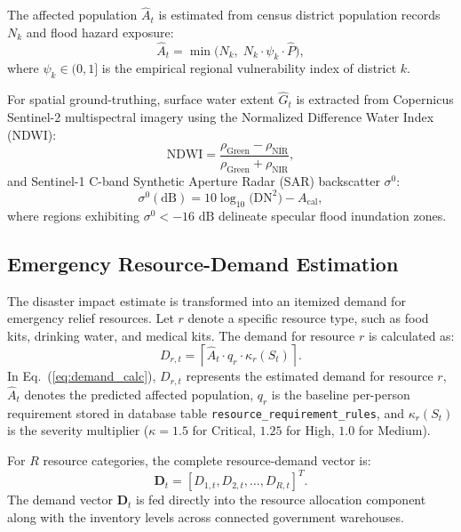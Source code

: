 \documentclass[conference]{IEEEtran}
\begin{document}
The affected population $\hat{A}_t$ is estimated from census district population records $N_k$ and flood hazard exposure:
\begin{equation}
\hat{A}_t = \min\big( N_k, \; N_k \cdot \psi_k \cdot \hat{P} \big),
\label{eq:affected_pop}
\end{equation}
where $\psi_k \in (0, 1]$ is the empirical regional vulnerability index of district $k$.

For spatial ground-truthing, surface water extent $\hat{G}_t$ is extracted from Copernicus Sentinel-2 multispectral imagery using the Normalized Difference Water Index (NDWI):
\begin{equation}
\text{NDWI} = \frac{\rho_{\text{Green}} - \rho_{\text{NIR}}}{\rho_{\text{Green}} + \rho_{\text{NIR}}},
\label{eq:ndwi}
\end{equation}
and Sentinel-1 C-band Synthetic Aperture Radar (SAR) backscatter $\sigma^0$:
\begin{equation}
\sigma^0 (\text{dB}) = 10 \log_{10} \big( \text{DN}^2 \big) - A_{\text{cal}},
\label{eq:sar}
\end{equation}
where regions exhibiting $\sigma^0 < -16\text{ dB}$ delineate specular flood inundation zones.

\subsection{Emergency Resource-Demand Estimation}
The disaster impact estimate is transformed into an itemized demand for emergency relief resources. Let $r$ denote a specific resource type, such as food kits, drinking water, and medical kits. The demand for resource $r$ is calculated as:
\begin{equation}
D_{r,t} = \left\lceil \hat{A}_t \cdot q_r \cdot \kappa_r(S_t) \right\rceil.
\label{eq:demand_calc}
\end{equation}
In Eq.~(\ref{eq:demand_calc}), $D_{r,t}$ represents the estimated demand for resource $r$, $\hat{A}_t$ denotes the predicted affected population, $q_r$ is the baseline per-person requirement stored in database table \texttt{resource\_requirement\_rules}, and $\kappa_r(S_t)$ is the severity multiplier ($\kappa = 1.5$ for Critical, $1.25$ for High, $1.0$ for Medium).

For $R$ resource categories, the complete resource-demand vector is:
\begin{equation}
\mathbf{D}_t = [D_{1,t}, D_{2,t}, \dots, D_{R,t}]^T.
\label{eq:demand_vector}
\end{equation}
The demand vector $\mathbf{D}_t$ is fed directly into the resource allocation component along with the inventory levels across connected government warehouses.
\end{document}
